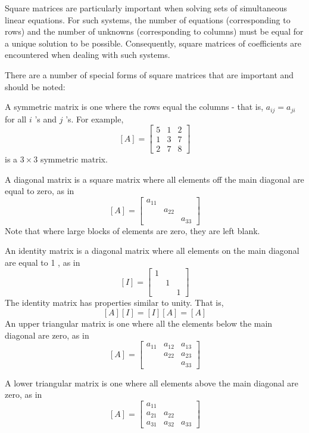 \documentclass[../main.tex]{subfiles}
\begin{document}
Square matrices are particularly important when solving sets of simultaneous linear equations. For such systems, the number of equations (corresponding to rows) and the number of unknowns (corresponding to columns) must be equal for a unique solution to be possible. Consequently, square matrices of coefficients are encountered when dealing with such systems.

There are a number of special forms of square matrices that are important and should be noted:

A symmetric matrix is one where the rows equal the columns - that is, $a_{i j}=a_{j i}$ for all $i$ 's and $j$ 's. For example,
$$
[A]=\left[\begin{array}{lll}
5 & 1 & 2 \\
1 & 3 & 7 \\
2 & 7 & 8
\end{array}\right]
$$
is a $3 \times 3$ symmetric matrix.

A diagonal matrix is a square matrix where all elements off the main diagonal are equal to zero, as in
$$
[A]=\left[\begin{array}{lll}
a_{11} & & \\
& a_{22} & \\
& & a_{33}
\end{array}\right]
$$
Note that where large blocks of elements are zero, they are left blank.

An identity matrix is a diagonal matrix where all elements on the main diagonal are equal to 1 , as in
$$
[I]=\left[\begin{array}{lll}
1 & & \\
& 1 & \\
& & 1
\end{array}\right]
$$
The identity matrix has properties similar to unity. That is,
$$
[A][I]=[I][A]=[A]
$$
An upper triangular matrix is one where all the elements below the main diagonal are zero, as in
$$
[A]=\left[\begin{array}{lll}
a_{11} & a_{12} & a_{13} \\
& a_{22} & a_{23} \\
& & a_{33}
\end{array}\right]
$$

A lower triangular matrix is one where all elements above the main diagonal are zero, as in
$$
[A]=\left[\begin{array}{lll}
a_{11} & & \\
a_{21} & a_{22} & \\
a_{31} & a_{32} & a_{33}
\end{array}\right]
$$
\end{document}
